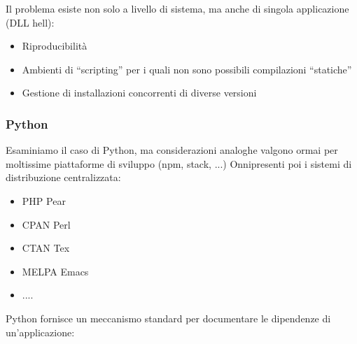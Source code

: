Il problema esiste non solo a livello di sistema, ma anche di singola applicazione (DLL hell):
\begin{itemize}
    \item Riproducibilità
    \item Ambienti di “scripting” per i quali non sono possibili compilazioni “statiche”
    \item Gestione di installazioni concorrenti di diverse versioni
\end{itemize}
\subsubsection{Python}
Esaminiamo il caso di Python, ma considerazioni analoghe valgono ormai per moltissime piattaforme di sviluppo (npm, stack, ...)
Onnipresenti poi i sistemi di distribuzione centralizzata:
\begin{itemize}
    \item PHP Pear
    \item CPAN Perl 
    \item CTAN Tex 
    \item MELPA Emacs
    \item ....
\end{itemize}
Python fornisce un meccanismo standard per documentare le dipendenze di un'applicazione:

